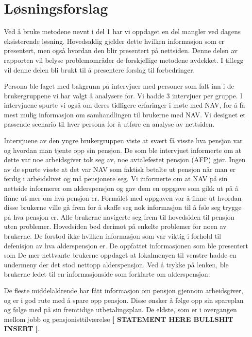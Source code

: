 \documentclass[informationsecurity]{gucmasterproject}
\begin{document}
\chapter{Løsningsforslag}
Ved å bruke metodene nevnt i del 1 har vi oppdaget en del mangler ved dagens eksisterende løsning. Hovedsaklig gjelder dette hvilken informasjon som er presentert, men også hvordan den blir presentert på nettsiden. Denne delen av rapporten vil belyse problemområder de forskjellige metodene avdekket. I tillegg vil denne delen bli brukt til å presentere forslag til forbedringer.

Persona ble laget med bakgrunn på intervjuer med personer som falt inn i de brukergruppene vi har valgt å analysere for. Vi hadde 3 intervjuer per gruppe. I intervjuene spurte vi også om deres tidligere erfaringer i møte med NAV, for å få mest mulig informasjon om samhandlingen til brukerne med NAV. Vi designet et passende scenario til hver persona for å utføre en analyse av nettsiden. 

Intervjuene av den yngre brukergruppen viste at svært få visste hva pensjon var og hvordan man tjente opp sin pensjon. De som ble intervjuet informerte om at dette var noe arbeidsgiver tok seg av, noe avtalefestet pensjon (AFP) gjør. Ingen av de spurte visste at det var NAV som faktisk betalte ut pensjon når man er ferdig i arbeidslivet og må pensjonere seg. Vi informerte om at NAV på sin nettside informerer om alderspensjon og gav dem en oppgave som gikk ut på å finne ut mer om hva pensjon er. Formålet med oppgaven var å finne ut hvordan disse brukerne ville gå frem for å skaffe seg nok informasjon til å føle seg trygge på hva pensjon er. 
Alle brukerne navigerte seg frem til hovedsiden til pensjon uten problemer. Hovedsiden bød derimot på enkelte problemer for noen av brukerne. De forstod ikke hvilken informasjon som var viktig i forhold til defenisjon av hva alderspensjon er. De oppfattet informasjonen som ble presentert som De mer nettvante brukerne oppdaget at lokalmenyen til venstre hadde en undermeny der det stod nettopp alderspensjon. Ved å trykke på lenken, ble brukerne ledet til en informasjonside som forklarte om alderspensjon. 


De fleste middelaldrende har fått informasjon om pensjon gjennom arbeidsgiver, og er i god rute med å spare opp pensjon. Disse ønsker å følge opp sin spareplan og følge med på sin fremtidige utbetalingsplan. De eldste, som er i overgangen mellom jobb og pensjonisttilværelse \textbf{[ STATEMENT HERE BULLSHIT INSERT ]}. 
\end{document}
